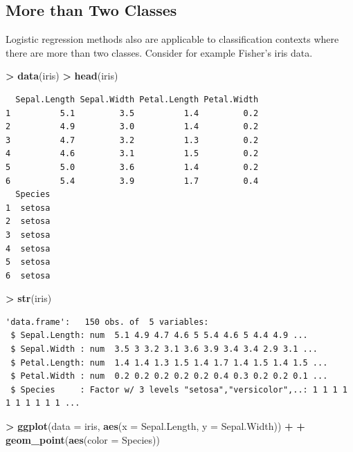 \documentclass[
]{krantz}
\makeatletter
\newenvironment{Shaded}{\begin{snugshade}}{\end{snugshade}}
\newcommand{\DataTypeTok}[1]{\textcolor[rgb]{0.27,0.27,0.27}{#1}}
\newcommand{\KeywordTok}[1]{\textcolor[rgb]{0.27,0.27,0.27}{\textbf{#1}}}
\newcommand{\NormalTok}[1]{#1}
\newcommand{\OperatorTok}[1]{\textcolor[rgb]{0.43,0.43,0.43}{\textbf{#1}}}
\newcommand{\StringTok}[1]{\textcolor[rgb]{0.5,0.5,0.5}{#1}}
\newenvironment{kframe}{%
\medskip{}
\setlength{\fboxsep}{.8em}
 \def\at@end@of@kframe{}%
 \ifinner\ifhmode%
  \def\at@end@of@kframe{\end{minipage}}%
  \begin{minipage}{\columnwidth}%
 \fi\fi%
 \def\FrameCommand##1{\hskip\@totalleftmargin \hskip-\fboxsep
 \colorbox{shadecolor}{##1}\hskip-\fboxsep
     \hskip-\linewidth \hskip-\@totalleftmargin \hskip\columnwidth}%
 \MakeFramed {\advance\hsize-\width
   \@totalleftmargin\z@ \linewidth\hsize
   \@setminipage}}%
 {\par\unskip\endMakeFramed%
 \at@end@of@kframe}
\renewenvironment{Shaded}{\begin{kframe}}{\end{kframe}}
\makeatother
\begin{document}
\hypertarget{more-than-two-classes}{%
\subsection{More than Two Classes}\label{more-than-two-classes}}

Logistic regression methods also are applicable to classification contexts where there are more than two classes. Consider for example Fisher's iris data.

\begin{Shaded}
\begin{Highlighting}[]
\OperatorTok{\textgreater{}}\StringTok{ }\KeywordTok{data}\NormalTok{(iris)}
\OperatorTok{\textgreater{}}\StringTok{ }\KeywordTok{head}\NormalTok{(iris)}
\end{Highlighting}
\end{Shaded}

\begin{verbatim}
  Sepal.Length Sepal.Width Petal.Length Petal.Width
1          5.1         3.5          1.4         0.2
2          4.9         3.0          1.4         0.2
3          4.7         3.2          1.3         0.2
4          4.6         3.1          1.5         0.2
5          5.0         3.6          1.4         0.2
6          5.4         3.9          1.7         0.4
  Species
1  setosa
2  setosa
3  setosa
4  setosa
5  setosa
6  setosa
\end{verbatim}

\begin{Shaded}
\begin{Highlighting}[]
\OperatorTok{\textgreater{}}\StringTok{ }\KeywordTok{str}\NormalTok{(iris)}
\end{Highlighting}
\end{Shaded}

\begin{verbatim}
'data.frame':   150 obs. of  5 variables:
 $ Sepal.Length: num  5.1 4.9 4.7 4.6 5 5.4 4.6 5 4.4 4.9 ...
 $ Sepal.Width : num  3.5 3 3.2 3.1 3.6 3.9 3.4 3.4 2.9 3.1 ...
 $ Petal.Length: num  1.4 1.4 1.3 1.5 1.4 1.7 1.4 1.5 1.4 1.5 ...
 $ Petal.Width : num  0.2 0.2 0.2 0.2 0.2 0.4 0.3 0.2 0.2 0.1 ...
 $ Species     : Factor w/ 3 levels "setosa","versicolor",..: 1 1 1 1 1 1 1 1 1 1 ...
\end{verbatim}

\begin{Shaded}
\begin{Highlighting}[]
\OperatorTok{\textgreater{}}\StringTok{ }\KeywordTok{ggplot}\NormalTok{(}\DataTypeTok{data =}\NormalTok{ iris, }\KeywordTok{aes}\NormalTok{(}\DataTypeTok{x =}\NormalTok{ Sepal.Length, }\DataTypeTok{y =}\NormalTok{ Sepal.Width)) }\OperatorTok{+}\StringTok{ }
\OperatorTok{+}\StringTok{   }\KeywordTok{geom\_point}\NormalTok{(}\KeywordTok{aes}\NormalTok{(}\DataTypeTok{color =}\NormalTok{ Species))}
\end{Highlighting}
\end{Shaded}
\end{document}
